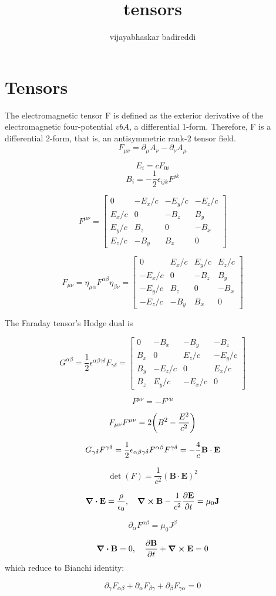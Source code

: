 \documentclass[12pt]{article}
\title{tensors}
\author{vijayabhaskar badireddi}
\date{}
\begin{document}
\section*{Tensors}
The electromagnetic tensor F is defined as the exterior derivative of the electromagnetic four-potential $vb{A}$, a differential 1-form.
Therefore, F is a differential 2-form, that is, an antisymmetric rank-2 tensor field.
\[F_{\mu\nu} = \partial_\mu A_\nu - \partial_\nu A_\mu\]

\[E_{i}=cF_{0i}\]
\[B_{i}=-\frac{1}{2}\epsilon_{ijk}F^{jk}\]

\[ F^{\mu\nu}={\begin{bmatrix}0&-E_{x}/c&-E_{y}/c&-E_{z}/c\\E_{x}/c&0&-B_{z}&B_{y}\\E_{y}/c&B_{z}&0&-B_{x}\\E_{z}/c&-B_{y}&B_{x}&0\end{bmatrix}}\]

\[ F_{\mu \nu }=\eta _{\mu \alpha }F^{\alpha \beta }\eta _{\beta \nu }={\begin{bmatrix}0&E_{x}/c&E_{y}/c&E_{z}/c\\-E_{x}/c&0&-B_{z}&B_{y}\\-E_{y}/c&B_{z}&0&-B_{x}\\-E_{z}/c&-B_{y}&B_{x}&0\end{bmatrix}}\]

The Faraday tensor's Hodge dual is

\[ {G^{\alpha \beta }=\frac {1}{2}\epsilon ^{\alpha \beta \gamma \delta }F_{\gamma \delta }={\begin{bmatrix}0&-B_{x}&-B_{y}&-B_{z}\\B_{x}&0&E_{z}/c&-E_{y}/c\\B_{y}&-E_{z}/c&0&E_{x}/c\\B_{z}&E_{y}/c&-E_{x}/c&0\end{bmatrix}}}\]

\[\tag{anti symmetry} F^{\mu \nu }=-F^{\nu \mu }\]

\[ F_{\mu \nu }F^{\mu \nu }=2\qty(B^{2}-{\frac {E^{2}}{c^{2}}})\]

\[G_{\gamma \delta }F^{\gamma \delta }=\frac {1}{2}\epsilon _{\alpha \beta \gamma \delta }F^{\alpha \beta }F^{\gamma \delta }=-\frac {4}{c}\vb{B}\cdot \vb{E}\]

\[\det \left(F\right)={\frac {1}{c^{2}}}\left({\mathbf {B}}\cdot {\mathbf {E}}\right)^{2}\]

\[\div{\vb{E}} = \frac{\rho}{\epsilon_0},\quad \curl{\vb{B}} - \frac{1}{c^2} \pdv{\vb{E}}{t} = \mu_0 \vb{J}
\]

\[\partial_{\alpha} F^{\alpha\beta} = \mu_0 J^{\beta}\]

\[ \div{\vb{B}} = 0,\quad \pdv{\vb{B}}{t} + \curl{\vb{E}} = 0 \]
which reduce to Bianchi identity:

\[\partial_\gamma F_{ \alpha \beta } + \partial_\alpha F_{ \beta \gamma } + \partial_\beta F_{ \gamma \alpha } = 0 \]
\end{document}
